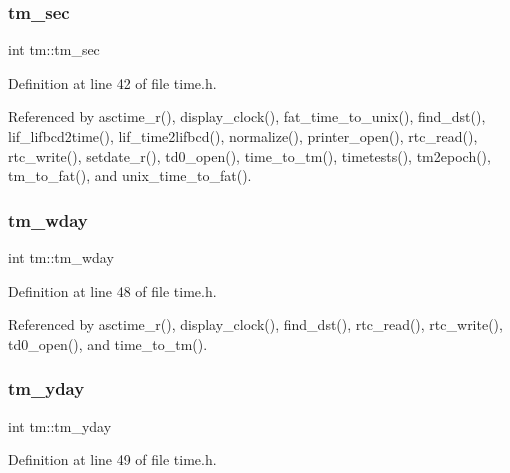 \mbox{\label{structtm_a4d098a9a5c03a00b2ee61e10851de81e}} 
\subsubsection{\texorpdfstring{tm\+\_\+sec}{tm\_sec}}
{\footnotesize\ttfamily int tm\+::tm\+\_\+sec}



Definition at line 42 of file time.\+h.



Referenced by asctime\+\_\+r(), display\+\_\+clock(), fat\+\_\+time\+\_\+to\+\_\+unix(), find\+\_\+dst(), lif\+\_\+lifbcd2time(), lif\+\_\+time2lifbcd(), normalize(), printer\+\_\+open(), rtc\+\_\+read(), rtc\+\_\+write(), setdate\+\_\+r(), td0\+\_\+open(), time\+\_\+to\+\_\+tm(), timetests(), tm2epoch(), tm\+\_\+to\+\_\+fat(), and unix\+\_\+time\+\_\+to\+\_\+fat().

\mbox{\label{structtm_afe81a8c46f1c693c43f259b288859f4f}} 
\subsubsection{\texorpdfstring{tm\+\_\+wday}{tm\_wday}}
{\footnotesize\ttfamily int tm\+::tm\+\_\+wday}



Definition at line 48 of file time.\+h.



Referenced by asctime\+\_\+r(), display\+\_\+clock(), find\+\_\+dst(), rtc\+\_\+read(), rtc\+\_\+write(), td0\+\_\+open(), and time\+\_\+to\+\_\+tm().

\mbox{\label{structtm_a93a0ba77cc23796df84405dcbcc57eb1}} 
\subsubsection{\texorpdfstring{tm\+\_\+yday}{tm\_yday}}
{\footnotesize\ttfamily int tm\+::tm\+\_\+yday}



Definition at line 49 of file time.\+h.



